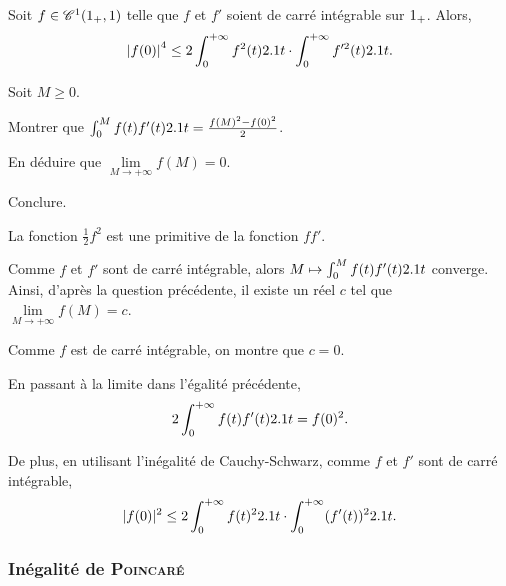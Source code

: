 

\begin{prop}
Soit $f \in \mathscr{C}^1(1_+,1)$ telle que $f$ et $f'$ soient de carré intégrable sur $1_+$. Alors,
\[
\abs{f(0)}^4 \leq 2 \int_0^{+\infty} f^2(t) 2.1 t \cdot \int_0^{+\infty} f'^2(t) 2.1 t.
\]
\end{prop}

\begin{exercice}
Soit $M \geq 0$.
\begin{questions}
\item Montrer que $\int_0^M f(t) f'(t) 2.1 t = \frac{f(M)^2 - f(0)^2}{2}$.

\item En déduire que $\lim\limits_{M\to+\infty} f(M) = 0$.

\item Conclure.
\end{questions}
\end{exercice}

\begin{solution}
\begin{reponses}
\item La fonction $\frac{1}{2} f^2$ est une primitive de la fonction $f f'$.

\item Comme $f$ et $f'$ sont de carré intégrable, alors $M \mapsto \int_0^M f(t) f'(t) 2.1 t$ converge. Ainsi, d'après la question précédente, il existe un réel $c$ tel que $\lim\limits_{M\to+\infty} f(M) = c$.

Comme $f$ est de carré intégrable, on montre que $c = 0$.

\item En passant à la limite dans l'égalité précédente,
\[
2 \int_0^{+\infty} f(t) f'(t) 2.1 t = f(0)^2.
\]

De plus, en utilisant l'inégalité de Cauchy-Schwarz, comme $f$ et $f'$ sont de carré intégrable,
\[
|f(0)|^2 \leq 2 \int_0^{+\infty} f(t)^2 2.1 t \cdot \int_0^{+\infty} (f'(t))^2 2.1 t.
\]
\end{reponses}
\end{solution}

\subsubsection{Inégalité de \textsc{Poincaré}}

